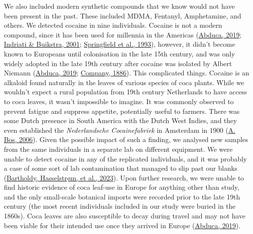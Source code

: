 \documentclass[
  letterpaper,
]{book}
\begin{document}
We also included modern synthetic compounds that we know would not have
been present in the past. These included MDMA, Fentanyl, Amphetamine,
and others. We detected cocaine in nine individuals. Cocaine is not a
modern compound, since it has been used for millennia in the Americas
(\protect\hyperlink{ref-abucaCocaTrade2019}{Abduca, 2019};
\protect\hyperlink{ref-indriatiCocaPrehistoric2001}{Indriati \&
Buikstra, 2001};
\protect\hyperlink{ref-springfieldCocaineMetabolites1993}{Springfield et
al., 1993}), however, it didn't become known to Europeans until
colonisation in the late 15th century, and was only widely adopted in
the late 19th century after cocaine was isolated by Albert Niemann
(\protect\hyperlink{ref-abucaCocaTrade2019}{Abduca, 2019};
\protect\hyperlink{ref-marianiCoca1886}{Company, 1886}). This
complicated things. Cocaine is an alkaloid found naturally in the leaves
of various species of coca plants. While we wouldn't expect a rural
population from 19th century Netherlands to have access to coca leaves,
it wasn't impossible to imagine. It was commonly observed to prevent
fatigue and suppress appetite, potentially useful to farmers. There was
some Dutch presence in South America with the Dutch West Indies, and
they even established the \emph{Nederlandsche Cocainefabriek} in
Amsterdam in 1900 (\protect\hyperlink{ref-bosHistoryLicit2006}{A. Bos,
2006}). Given the possible impact of such a finding, we analysed new
samples from the same individuals in a separate lab on different
equipment. We were unable to detect cocaine in any of the replicated
individuals, and it was probably a case of some sort of lab
contamination that managed to slip past our blanks
(\protect\hyperlink{ref-bartholdyMultiproxyAnalysis2023}{Bartholdy,
Hasselstrøm, et al., 2023}). Upon further research, we were unable to
find historic evidence of coca leaf-use in Europe for anything other
than study, and the only small-scale botanical imports were recorded
prior to the late 19th century (the most recent individuals included in
our study were buried in the 1860s). Coca leaves are also susceptible to
decay during travel and may not have been viable for their intended use
once they arrived in Europe
(\protect\hyperlink{ref-abucaCocaTrade2019}{Abduca, 2019}).
\end{document}
